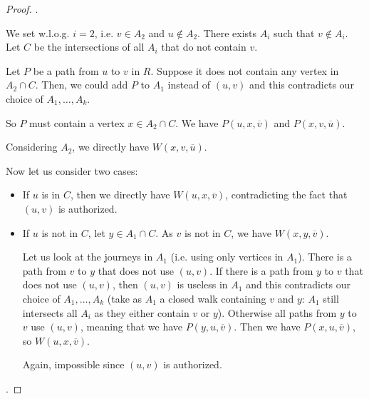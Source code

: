\documentclass[11pt]{article}%
\begin{document}
\begin{proof}
.

We set w.l.o.g. $i=2$, i.e. $v\in A_2$ and $u\not\in A_2$. There exists $A_i$ such that $v\not\in A_i$. Let $C$ be the intersections of all $A_i$ that do not contain $v$. 

Let $P$ be a path from $u$ to $v$ in $R$. Suppose it does not contain any vertex in $A_2\cap C$. Then, we could add $P$ to $A_1$ instead of $(u,v)$ and this contradicts our choice of $A_1,\dots, A_k$.  

So $P$ must contain a vertex $x\in A_2\cap C$. We have $P(u,x,\overline{v})$ and $P(x,v,\overline{u})$.

Considering $A_2$, we directly have $W(x,v,\overline{u})$. 

Now let us consider two cases:
\begin{itemize}
	\item If $u$ is in $C$, then we directly have $W(u,x,\overline{v})$, contradicting the fact that $(u,v)$ is authorized.
	\item If $u$ is not in $C$,
 let $y\in A_1\cap C$. As $v$ is not in $C$, we have $W(x,y,\overline{v})$. 

Let us look at the journeys in $A_1$ (i.e. using only vertices in $A_1$). There is a path from $v$ to $y$ that does not use $(u,v)$. If there is a path from $y$ to $v$ that does not use $(u,v)$, then $(u,v)$ is useless in $A_1$ and this contradicts our choice of $A_1,\dots, A_k$ (take as $A_1$ a closed walk containing $v$ and $y$: $A_1$ still intersects all $A_i$ as they either contain $v$ or $y$). Otherwise all paths from $y$ to $v$ use $(u,v)$, meaning that we have $P(y,u,\overline{v})$. Then we have  $P(x,u,\overline{v})$, so $W(u,x,\overline{v})$.

Again, impossible since $(u,v)$ is authorized.\\
\end{itemize}


.


\end{proof}
\end{document}
